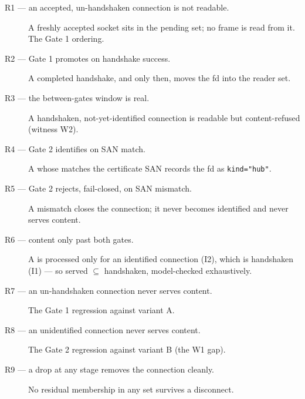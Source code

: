 \documentclass[a4paper,10pt,fleqn]{article}
\begin{document}
\begin{description}
  \item[R1 --- an accepted, un-handshaken connection is not readable.] A
    freshly accepted socket sits in the pending set; no frame is read from
    it.  The Gate 1 ordering.
  \item[R2 --- Gate 1 promotes on handshake success.] A completed
    handshake, and only then, moves the fd into the reader set.
  \item[R3 --- the between-gates window is real.] A handshaken,
    not-yet-identified connection is readable but content-refused (witness
    W2).
  \item[R4 --- Gate 2 identifies on SAN match.] A 
    whose  matches the certificate SAN records the fd as
    \texttt{kind="hub"}.
  \item[R5 --- Gate 2 rejects, fail-closed, on SAN mismatch.] A mismatch
    closes the connection; it never becomes identified and never serves
    content.
  \item[R6 --- content only past both gates.] A  is
    processed only for an identified connection (I2), which is
    handshaken (I1) --- so served $\subseteq$ handshaken, model-checked
    exhaustively.
  \item[R7 --- an un-handshaken connection never serves content.] The
    Gate 1 regression against variant A.
  \item[R8 --- an unidentified connection never serves content.] The
    Gate 2 regression against variant B (the W1 gap).
  \item[R9 --- a drop at any stage removes the connection cleanly.] No
    residual membership in any set survives a disconnect.
\end{description}
\end{document}
